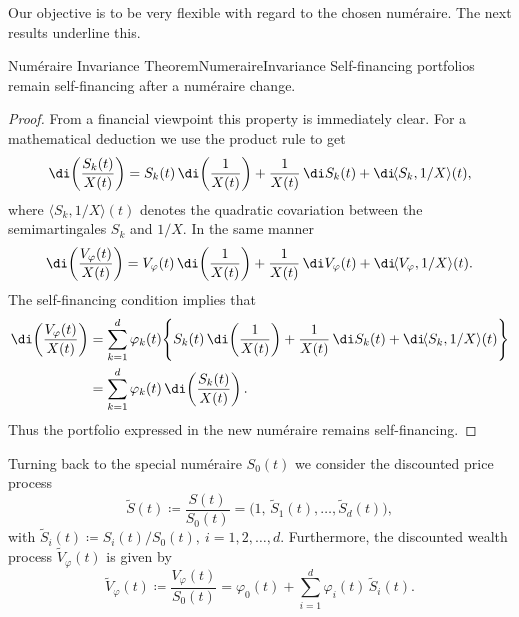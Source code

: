 Our objective is to be very flexible with regard to the chosen num\'{e}raire. The next results underline this.

\begin{prop}{Num\'{e}raire Invariance Theorem}{NumeraireInvariance}
	Self-financing portfolios remain self-financing after a num\'{e}raire change.
\end{prop}

\begin{proof}
	From a financial viewpoint this property is immediately clear. For a mathematical deduction we use the product rule to get
	\begin{equation}\label{eq:ProductRuleSkOverX}
		\di\!\left(\frac{S_k(t)}{X(t)}\right)
		= S_k(t)\,\di\!\left(\frac{1}{X(t)}\right)
		+ \frac{1}{X(t)}\,\di S_k(t)
		+ \di\!\langle S_k, 1/X \rangle (t),
	\end{equation}
	where \(\langle S_k, 1/X \rangle (t)\) denotes the quadratic covariation between the semimartingales \(S_k\) and \(1/X\). In the same manner
	\begin{equation}\label{eq:ProductRuleVphiOverX}
		\di\!\left(\frac{V_{\varphi}(t)}{X(t)}\right)
		= V_{\varphi}(t)\,\di\!\left(\frac{1}{X(t)}\right)
		+ \frac{1}{X(t)}\,\di V_{\varphi}(t)
		+ \di\!\langle V_{\varphi}, 1/X \rangle (t).
	\end{equation}
	The self-financing condition implies that
	\begin{align}\label{eq:SelfFinancingUnderNumeraireChange}
		\di\!\left(\frac{V_{\varphi}(t)}{X(t)}\right)
		 & = \sum_{k=1}^{d} \varphi_k(t)\Bigg\{
		S_k(t)\,\di\!\left(\frac{1}{X(t)}\right)
		+ \frac{1}{X(t)}\,\di S_k(t)
		+ \di\!\langle S_k, 1/X \rangle (t)
		\Bigg\}                                                                            \\
		 & = \sum_{k=1}^{d} \varphi_k(t)\,\di\!\left(\frac{S_k(t)}{X(t)}\right). \nonumber
	\end{align}
	Thus the portfolio expressed in the new num\'{e}raire remains self-financing. \qedhere
\end{proof}

Turning back to the special num\'{e}raire \(S_0(t)\) we consider the discounted price process
\begin{equation}\label{eq:DiscountedPriceVectorByS0}
	\widetilde{S}(t) \coloneqq \frac{S(t)}{S_0(t)} = \bigl(1,\,\widetilde{S}_1(t),\dots,\widetilde{S}_d(t)\bigr),
\end{equation}
with \(\widetilde{S}_i(t) \coloneqq S_i(t)/S_0(t),\ i=1,2,\dots,d.\) Furthermore, the discounted wealth process \( \widetilde{V}_{\varphi}(t)\) is given by
\begin{equation}\label{eq:DiscountedWealthByS0}
	\widetilde{V}_{\varphi}(t) \coloneqq \frac{V_{\varphi}(t)}{S_0(t)}
	= \varphi_0(t) + \sum_{i=1}^{d} \varphi_i(t)\,\widetilde{S}_i(t).
\end{equation}

